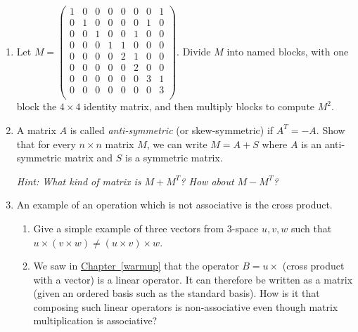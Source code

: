 \begin{enumerate}




\item Let $M = \begin{pmatrix}
1 & 0 & 0 & 0 & 0 & 0 & 0 & 1 \\
0 & 1 & 0 & 0 & 0 & 0 & 1 & 0 \\
0 & 0 & 1 & 0 & 0 & 1 & 0 & 0 \\
0 & 0 & 0 & 1 & 1 & 0 & 0 & 0 \\
0 & 0 & 0 & 0 & 2 & 1 & 0 & 0 \\
0 & 0 & 0 & 0 & 0 & 2 & 0 & 0 \\
0 & 0 & 0 & 0 & 0 & 0 & 3 & 1 \\
0 & 0 & 0 & 0 & 0 & 0 & 0 & 3 \\
\end{pmatrix}$.  Divide $M$ into named blocks, with one block the $4\times4$ identity matrix, and then multiply blocks to compute $M^2$.


\item A matrix $A$ is called \emph{anti-symmetric} (or skew-symmetric) if $A^T = -A$. Show that for every $n \times n$ matrix $M$, we can write $M = A + S$ where $A$ is an anti-symmetric matrix and $S$ is a symmetric matrix.

\emph{Hint: What kind of matrix is $M + M^T$? How about $M - M^T$?}

\item An example of an operation which is not associative is the cross product. 
\begin{enumerate}
\item Give a simple example of three vectors from 3-space $u,v,w$ such that $u\times (v\times w) \neq (u\times v)\times w$. 
\item We saw in \hyperlink{crossmat}{Chapter~\ref*{warmup}} that the operator $B=u\times$ (cross product with a vector) is a linear operator. It can therefore be written as a matrix (given an ordered basis such as the standard basis). How is it that composing such linear operators is non-associative even though matrix multiplication is associative? 


\end{enumerate}
\end{enumerate}
